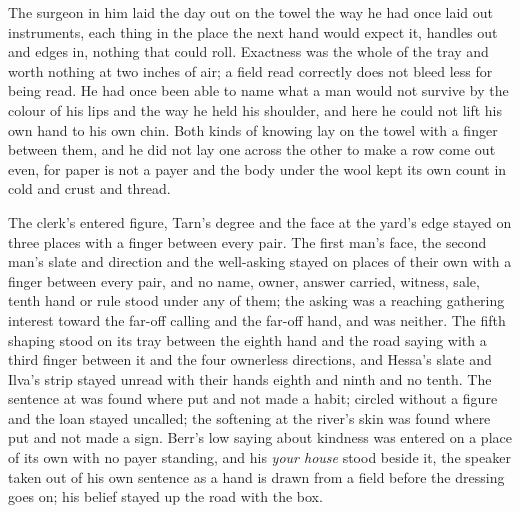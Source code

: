 The surgeon in him laid the day out on the towel the way he had once laid out instruments, each thing in the place the next hand would expect it, handles out and edges in, nothing that could roll. Exactness was the whole of the tray and worth nothing at two inches of air; a field read correctly does not bleed less for being read. He had once been able to name what a man would not survive by the colour of his lips and the way he held his shoulder, and here he could not lift his own hand to his own chin. Both kinds of knowing lay on the towel with a finger between them, and he did not lay one across the other to make a row come out even, for paper is not a payer and the body under the wool kept its own count in cold and crust and thread.

The clerk's entered figure, Tarn's degree and the face at the yard's edge stayed on three places with a finger between every pair. The first man's face, the second man's slate and direction and the well-asking stayed on places of their own with a finger between every pair, and no name, owner, answer carried, witness, sale, tenth hand or rule stood under any of them; the asking was a reaching gathering interest toward the far-off calling and the far-off hand, and was neither. The fifth shaping stood on its tray between the eighth hand and the road saying with a third finger between it and the four ownerless directions, and Hessa's slate and Ilva's strip stayed unread with their hands eighth and ninth and no tenth. The sentence at  was found where put and not made a habit;  circled without a figure and the loan stayed uncalled; the softening at the river's skin was found where put and not made a sign. Berr's low saying about kindness was entered on a place of its own with no payer standing, and his \emph{your house} stood beside it, the speaker taken out of his own sentence as a hand is drawn from a field before the dressing goes on; his belief stayed up the road with the box.

